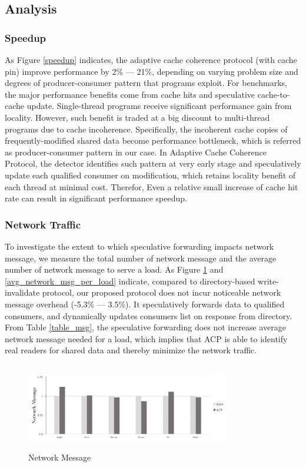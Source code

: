 \documentclass[11pt,conference]{IEEEtran}
\begin{document}
\subsection{Analysis}

\subsubsection{Speedup}
As Figure \ref{speedup} indicates, the adaptive cache coherence protocol (with cache pin) improve performance by 2\% --- 21\%, depending on varying problem size and degrees of producer-consumer pattern that programs exploit. For benchmarks, the major performance benefits come from cache hits and speculative cache-to-cache update. Single-thread programs receive significant performance gain from locality. However, such benefit is traded at a big discount to multi-thread programs due to cache incoherence. Specifically, the incoherent cache copies of frequently-modified shared data become performance bottleneck, which is referred as producer-consumer pattern in our case. In Adaptive Cache Coherence Protocol, the detector identifies such pattern at very early stage and speculatively update each qualified consumer on modification, which retains locality benefit of each thread at minimal cost. Therefor, Even a relative small increase of cache hit rate can result in significant performance speedup.

\subsubsection{Network Traffic}
To investigate the extent to which speculative forwarding impacts network message, we measure the total number of network message and the average number of network message to serve a load. As Figure \ref{network_msg} and \ref{avg_network_msg_per_load} indicate, compared to directory-based write-invalidate protocol, our proposed protocol does not incur noticeable network message overhead (-5.3\% --- 3.5\%). It speculatively forwards data to qualified consumers, and dynamically updates consumers list on response from directory. From Table \ref{table_msg}, the speculative forwarding does not increase average network message needed for a load, which implies that ACP is able to identify real readers for shared data and thereby minimize the network traffic.

\begin{figure}[!h]
\centering
\captionsetup{justification=centering}
\includegraphics[width=3.5in,height=1.5in]{network_msg.png}
\caption{Network Message}
\label{network_msg}
\end{figure}
\FloatBarrier
\end{document}

